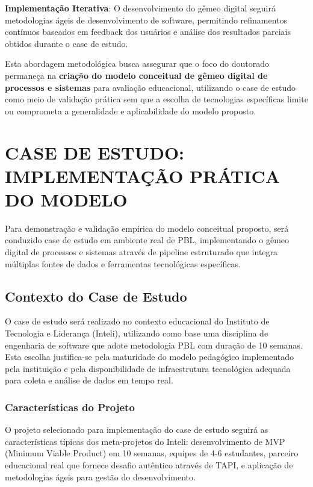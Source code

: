 \documentclass[12pt, a4paper, oneside, brazilian]{abntex2}
\begin{document}
\textbf{Implementação Iterativa}: O desenvolvimento do gêmeo digital seguirá metodologias ágeis de desenvolvimento de software, permitindo refinamentos contínuos baseados em feedback dos usuários e análise dos resultados parciais obtidos durante o case de estudo.

Esta abordagem metodológica busca assegurar que o foco do doutorado permaneça na \textbf{criação do modelo conceitual de gêmeo digital de processos e sistemas} para avaliação educacional, utilizando o case de estudo como meio de validação prática sem que a escolha de tecnologias específicas limite ou comprometa a generalidade e aplicabilidade do modelo proposto.

\section{CASE DE ESTUDO: IMPLEMENTAÇÃO PRÁTICA DO MODELO}

Para demonstração e validação empírica do modelo conceitual proposto, será conduzido case de estudo em ambiente real de PBL, implementando o gêmeo digital de processos e sistemas através de pipeline estruturado que integra múltiplas fontes de dados e ferramentas tecnológicas específicas.

\subsection{Contexto do Case de Estudo}

O case de estudo será realizado no contexto educacional do Instituto de Tecnologia e Liderança (Inteli), utilizando como base uma disciplina de engenharia de software que adote metodologia PBL com duração de 10 semanas. Esta escolha justifica-se pela maturidade do modelo pedagógico implementado pela instituição \cite{inteli2024} e pela disponibilidade de infraestrutura tecnológica adequada para coleta e análise de dados em tempo real.

\subsubsection{Características do Projeto}

O projeto selecionado para implementação do case de estudo seguirá as características típicas dos meta-projetos do Inteli: desenvolvimento de MVP (Minimum Viable Product) em 10 semanas, equipes de 4-6 estudantes, parceiro educacional real que fornece desafio autêntico através de TAPI, e aplicação de metodologias ágeis para gestão do desenvolvimento.
\end{document}
